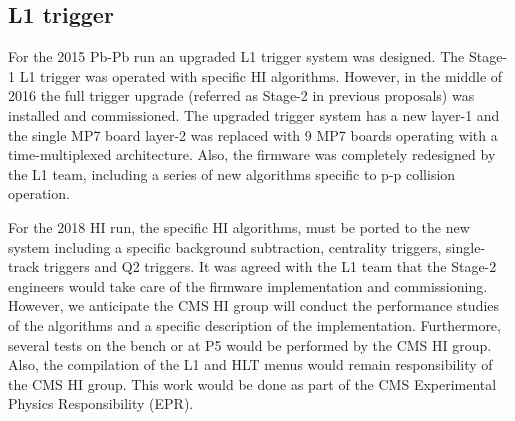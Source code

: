 \subsection{L1 trigger\label{subsec:L1Trigger}}
For the 2015 Pb-Pb run an upgraded L1 trigger system was designed. The Stage-1 L1 trigger was operated with specific HI algorithms. However, in the middle of 2016 the full trigger upgrade (referred as Stage-2 in previous proposals) was installed and commissioned. The upgraded trigger system has a new layer-1 and the single MP7 board layer-2 was replaced with 9 MP7 boards operating with a time-multiplexed architecture. Also, the firmware was completely redesigned by the L1 team, including a series of new algorithms specific to p-p collision operation. 

For the 2018 HI run, the specific HI algorithms, must be ported to the new system including a specific background subtraction, centrality triggers, single-track triggers and Q2 triggers. It was agreed with the L1 team that the Stage-2 engineers would take care of the firmware implementation and commissioning. However, we anticipate the CMS HI group will conduct the performance studies of the algorithms and a specific description of the implementation. Furthermore, several tests on the bench or at P5 would be performed by the CMS HI group. Also, the compilation of the L1 and HLT menus would remain responsibility of the CMS HI group. This work would be done as part of the CMS Experimental Physics Responsibility (EPR).
